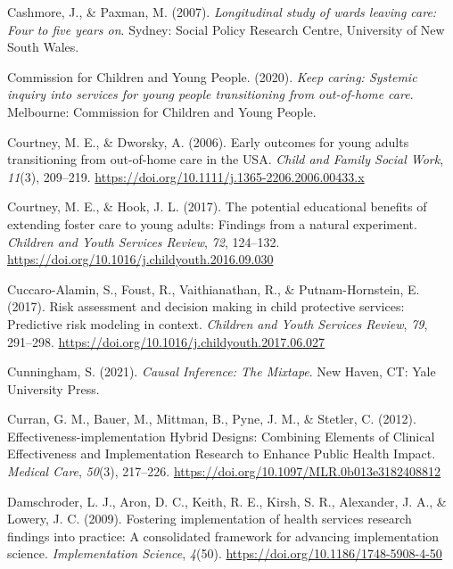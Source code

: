 \documentclass[
  jou,
  floatsintext,
  longtable,
  nolmodern,
  notxfonts,
  notimes,
  colorlinks=true,linkcolor=blue,citecolor=blue,urlcolor=blue]{apa7}
\newlength{\cslhangindent}
\newenvironment{CSLReferences}[2] %
 {\begin{list}{}{%
  \setlength{\itemindent}{0pt}
  \setlength{\leftmargin}{0pt}
  \setlength{\parsep}{0pt}
  \ifodd #1
   \setlength{\leftmargin}{\cslhangindent}
   \setlength{\itemindent}{-1\cslhangindent}
  \fi
  \setlength{\itemsep}{#2\baselineskip}}}
 {\end{list}}
\begin{document}
\begin{CSLReferences}{1}{0}
Cashmore, J., \& Paxman, M. (2007). \emph{Longitudinal study of wards
leaving care: Four to five years on}. Sydney: Social Policy Research
Centre, University of New South Wales.

Commission for Children and Young People. (2020). \emph{Keep caring:
{Systemic} inquiry into services for young people transitioning from
out-of-home care}. Melbourne: {Commission for Children and Young
People}.

Courtney, M. E., \& Dworsky, A. (2006). Early outcomes for young adults
transitioning from out-of-home care in the {USA}. \emph{Child and Family
Social Work}, \emph{11}(3), 209--219.
\url{https://doi.org/10.1111/j.1365-2206.2006.00433.x}

Courtney, M. E., \& Hook, J. L. (2017). The potential educational
benefits of extending foster care to young adults: {Findings} from a
natural experiment. \emph{Children and Youth Services Review},
\emph{72}, 124--132.
\url{https://doi.org/10.1016/j.childyouth.2016.09.030}

Cuccaro-Alamin, S., Foust, R., Vaithianathan, R., \& Putnam-Hornstein,
E. (2017). Risk assessment and decision making in child protective
services: {Predictive} risk modeling in context. \emph{Children and
Youth Services Review}, \emph{79}, 291--298.
\url{https://doi.org/10.1016/j.childyouth.2017.06.027}

Cunningham, S. (2021). \emph{Causal {Inference}: {The Mixtape}}. New
Haven, CT: Yale University Press.

Curran, G. M., Bauer, M., Mittman, B., Pyne, J. M., \& Stetler, C.
(2012). Effectiveness-implementation {Hybrid Designs}: {Combining
Elements} of {Clinical Effectiveness} and {Implementation Research} to
{Enhance Public Health Impact}. \emph{Medical Care}, \emph{50}(3),
217--226. \url{https://doi.org/10.1097/MLR.0b013e3182408812}

Damschroder, L. J., Aron, D. C., Keith, R. E., Kirsh, S. R., Alexander,
J. A., \& Lowery, J. C. (2009). Fostering implementation of health
services research findings into practice: {A} consolidated framework for
advancing implementation science. \emph{Implementation Science},
\emph{4}(50). \url{https://doi.org/10.1186/1748-5908-4-50}


\end{CSLReferences}
\end{document}
